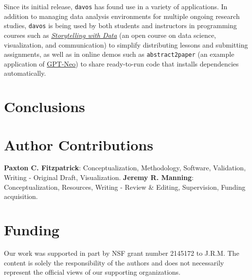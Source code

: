 \documentclass[preprint,12pt, a4paper]{elsarticle}
\begin{document}
Since its initial release, \texttt{davos} has found use in a variety
of applications.  In addition to managing data analysis environments
for multiple ongoing research studies, \texttt{davos} is being used by
both students and instructors in programming courses such as
\href{https://github.com/ContextLab/storytelling-with-data}{\textit{Storytelling
    with Data}} \cite{Mann21b} (an open course on data science,
visualization, and communication) to simplify distributing lessons and
submitting assignments, as well as in online demos such as
{\texttt{abstract2paper}} \cite{Mann21a} (an example application of
\href{https://github.com/EleutherAI/gpt-neo}{GPT-Neo}) to share
ready-to-run code that installs dependencies automatically.








\section{Conclusions}


\section*{Author Contributions}
\textbf{Paxton C. Fitzpatrick}: Conceptualization, Methodology, Software, Validation, Writing - Original Draft, Visualization. \textbf{Jeremy R. Manning}: Conceptualization, Resources, Writing - Review \& Editing, Supervision, Funding acquisition.

\section*{Funding}
Our work was supported in part by NSF grant number 2145172 to J.R.M.
The content is solely the responsibility of the authors and does not necessarily represent the official views of our supporting organizations.
\end{document}
